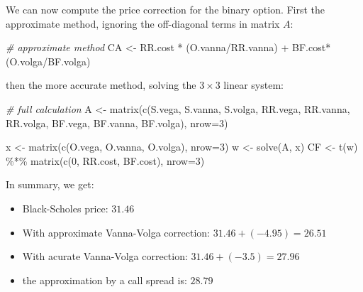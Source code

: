 \documentclass[]{tufte-book}
\newenvironment{Shaded}{}{}
\newcommand{\AttributeTok}[1]{\textcolor[rgb]{0.49,0.56,0.16}{#1}}
\newcommand{\CommentTok}[1]{\textcolor[rgb]{0.38,0.63,0.69}{\textit{#1}}}
\newcommand{\DecValTok}[1]{\textcolor[rgb]{0.25,0.63,0.44}{#1}}
\newcommand{\FunctionTok}[1]{\textcolor[rgb]{0.02,0.16,0.49}{#1}}
\newcommand{\NormalTok}[1]{#1}
\newcommand{\OtherTok}[1]{\textcolor[rgb]{0.00,0.44,0.13}{#1}}
\newcommand{\SpecialCharTok}[1]{\textcolor[rgb]{0.25,0.44,0.63}{#1}}
\begin{document}
We can now compute the price correction for the binary option. First the
approximate method, ignoring the off-diagonal terms in matrix \(A\):

\begin{Shaded}
\begin{Highlighting}[]
  \CommentTok{\# approximate method}
\NormalTok{  CA }\OtherTok{\textless{}{-}}\NormalTok{ RR.cost }\SpecialCharTok{*}\NormalTok{ (O.vanna}\SpecialCharTok{/}\NormalTok{RR.vanna) }\SpecialCharTok{+}\NormalTok{ BF.cost}\SpecialCharTok{*}\NormalTok{(O.volga}\SpecialCharTok{/}\NormalTok{BF.volga)}
\end{Highlighting}
\end{Shaded}

then the more accurate method, solving the \(3\times3\) linear system:

\begin{Shaded}
\begin{Highlighting}[]
  \CommentTok{\# full calculation}
\NormalTok{  A }\OtherTok{\textless{}{-}} \FunctionTok{matrix}\NormalTok{(}\FunctionTok{c}\NormalTok{(S.vega, S.vanna, S.volga,}
\NormalTok{                RR.vega, RR.vanna, RR.volga,}
\NormalTok{                BF.vega, BF.vanna, BF.volga), }\AttributeTok{nrow=}\DecValTok{3}\NormalTok{)}

\NormalTok{  x }\OtherTok{\textless{}{-}} \FunctionTok{matrix}\NormalTok{(}\FunctionTok{c}\NormalTok{(O.vega, O.vanna, O.volga), }\AttributeTok{nrow=}\DecValTok{3}\NormalTok{)}
\NormalTok{  w }\OtherTok{\textless{}{-}} \FunctionTok{solve}\NormalTok{(A, x)}
\NormalTok{  CF }\OtherTok{\textless{}{-}} \FunctionTok{t}\NormalTok{(w) }\SpecialCharTok{\%*\%} \FunctionTok{matrix}\NormalTok{(}\FunctionTok{c}\NormalTok{(}\DecValTok{0}\NormalTok{, RR.cost, BF.cost), }\AttributeTok{nrow=}\DecValTok{3}\NormalTok{)}
\end{Highlighting}
\end{Shaded}

In summary, we get:

\begin{itemize}
\item
  Black-Scholes price: \(31.46\)
\item
  With approximate Vanna-Volga correction:
  \(31.46 + (-4.95) = 26.51\)
\item
  With acurate Vanna-Volga correction:
  \(31.46 + (-3.5) = 27.96\)
\item
  the approximation by a call spread is: \(28.79\)
\end{itemize}
\end{document}

